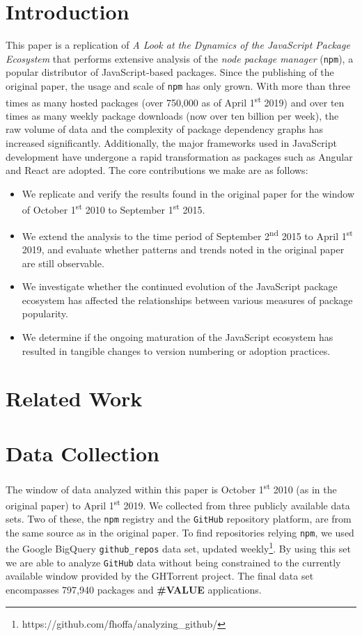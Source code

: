 \documentclass[10pt,conference]{IEEEtran}
\def\code#1{\texttt{#1}}
\begin{document}
\section{Introduction}
This paper is a replication of \emph{A Look at the Dynamics of the JavaScript Package Ecosystem}\cite{Wittern:2016} that performs extensive analysis of 
the \emph{node package manager} (\code{npm}), a popular distributor of JavaScript-based packages. Since the publishing of the original paper, the usage and scale of \code{npm} has only grown. With more than three times as many hosted packages (over 750,000 as of April 1\textsuperscript{st} 2019) 
and over ten times as many weekly package downloads (now over ten billion per week), the raw volume of data and the complexity of package dependency graphs has increased significantly. 
Additionally, the major frameworks used in JavaScript development have undergone a rapid transformation as packages such as Angular and React are adopted\footnotemark[\ref{adoption}].
The core contributions we make are as follows:
\begin{itemize}
  \item We replicate and verify the results found in the original paper for the window of October 1\textsuperscript{st} 2010 to September 1\textsuperscript{st} 2015.
  \item We extend the analysis to the time period of September 2\textsuperscript{nd} 2015 to April 1\textsuperscript{st} 2019, and evaluate whether patterns and trends noted in the original paper are still observable.
  \item We investigate whether the continued evolution of the JavaScript package ecosystem has affected the relationships between various measures of package popularity.
  \item We determine if the ongoing maturation of the JavaScript ecosystem has resulted in tangible changes to version numbering or adoption practices.
\end{itemize}

\section{Related Work}


\section{Data Collection}
The window of data analyzed within this paper is October 1\textsuperscript{st} 2010 (as in the original paper) to April 1\textsuperscript{st} 2019.
We collected from three publicly available data sets. Two of these, the \code{npm} registry and the \code{GitHub} repository platform, are from the same source as in the original paper.
To find repositories relying \code{npm}, we used the Google BigQuery \code{github\_repos} data set, updated weekly\footnote{https://github.com/fhoffa/analyzing\_github/}.
By using this set we are able to analyze \code{GitHub} data without being constrained to the currently available window provided by the GHTorrent project\cite{ghtorrent}.
The final data set encompasses 797,940 packages and \textbf{\#VALUE} applications.
\end{document}

